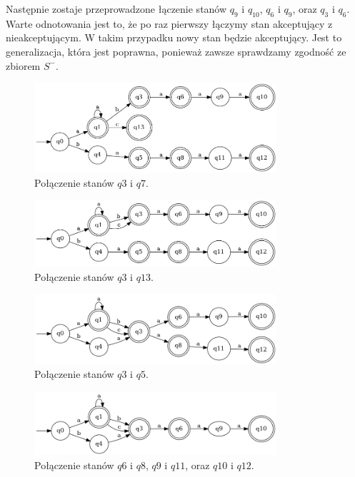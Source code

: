 Następnie zostaje przeprowadzone łączenie stanów \( q_9 \) i \( q_{10} \), \( q_6 \) i \( q_9 \), oraz \( q_3 \) i \( q_6 \). Warte odnotowania jest to, że po raz pierwszy łączymy stan akceptujący z nieakceptującym. W takim przypadku nowy stan będzie akceptujący. Jest to generalizacja, która jest poprawna, ponieważ zawsze sprawdzamy zgodność ze zbiorem \( S^- \).

\begin{figure}[ht]
    \centering
    \includegraphics[width=0.8\textwidth]{images/run_example/rpni/2.png}
    \caption{Połączenie stanów \( q3 \) i \( q7 \).}
    \label{fig:pta02}
\end{figure}

\begin{figure}[ht]
    \centering
    \includegraphics[width=0.8\textwidth]{images/run_example/rpni/3.png}
    \caption{Połączenie stanów \( q3 \) i \( q13 \).}
    \label{fig:pta03}
\end{figure}

\begin{figure}[ht]
    \centering
    \includegraphics[width=0.8\textwidth]{images/run_example/rpni/4.png}
    \caption{Połączenie stanów \( q3 \) i \( q5 \).}
    \label{fig:pta04}
\end{figure}

\begin{figure}[ht]
    \centering
    \includegraphics[width=0.8\textwidth]{images/run_example/rpni/5.png}
    \caption{Połączenie stanów \( q6 \) i \( q8 \), \( q9 \) i \( q11 \), oraz \( q10 \) i \( q12 \).}
    \label{fig:pta05}
\end{figure}

